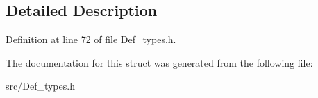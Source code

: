 \subsection{Detailed Description}


Definition at line 72 of file Def\+\_\+types.\+h.



The documentation for this struct was generated from the following file\+:\begin{DoxyCompactItemize}
\item 
src/Def\+\_\+types.\+h\end{DoxyCompactItemize}
